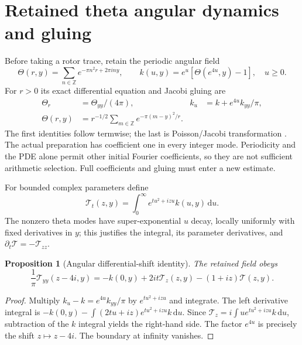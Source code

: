 \documentclass[11pt]{article}
\newtheorem{proposition}[theorem]{Proposition}
\theoremstyle{definition}
\theoremstyle{remark}
\newcommand{\dd}{\,\mathrm d}
\begin{document}
\section{Retained theta angular dynamics and gluing}
\label{sec:angular}

Before taking a rotor trace, retain the periodic angular field
\begin{equation}
 \Theta(r,y)=\sum_{n\in\mathbb Z}e^{-\pi n^2r+2\pi iny},
 \qquad k(u,y)=e^u[\Theta(e^{4u},y)-1],\quad u\ge0.
 \label{eq:angular}
\end{equation}
For $r>0$ its exact differential equation and Jacobi gluing are
\begin{align}
 \Theta_r&=\Theta_{yy}/(4\pi),
 &k_u&=k+e^{4u}k_{yy}/\pi,\label{eq:angular-pde}\\
 \Theta(r,y)&=r^{-1/2}\sum_{m\in\mathbb Z}
                        e^{-\pi(m-y)^2/r}.\label{eq:jacobi}
\end{align}
The first identities follow termwise; the last is Poisson/Jacobi
transformation \cite{dlmftheta}. The actual preparation has coefficient
one in every integer mode. Periodicity and the PDE alone permit other
initial Fourier coefficients, so they are not sufficient arithmetic
selection. Full coefficients and gluing must enter a new estimate.

For bounded complex parameters define
\begin{equation}
 \mathcal T_t(z,y)=\int_0^\infty e^{tu^2+izu}k(u,y)\dd u.
 \label{eq:Tfield}
\end{equation}
The nonzero theta modes have super-exponential $u$ decay, locally
uniformly with fixed derivatives in $y$; this justifies the integral,
its parameter derivatives, and $\partial_t\mathcal T=-\mathcal T_{zz}$.

\begin{proposition}[Angular differential-shift identity]
\label{prop:angular-shift}
The retained field obeys
\begin{equation}
 \frac1\pi\mathcal T_{yy}(z-4i,y)
 =-k(0,y)+2it\mathcal T_z(z,y)-(1+iz)\mathcal T(z,y).
 \label{eq:angular-shift}
\end{equation}
\end{proposition}
\begin{proof}
Multiply $k_u-k=e^{4u}k_{yy}/\pi$ by $e^{tu^2+izu}$ and integrate.
The left derivative integral is
$-k(0,y)-\int(2tu+iz)e^{tu^2+izu}k\dd u$.
Since $\mathcal T_z=i\int u e^{tu^2+izu}k\dd u$, subtraction of the
$k$ integral yields the right-hand side. The factor $e^{4u}$ is precisely
the shift $z\mapsto z-4i$. The boundary at infinity vanishes.
\end{proof}
\end{document}

